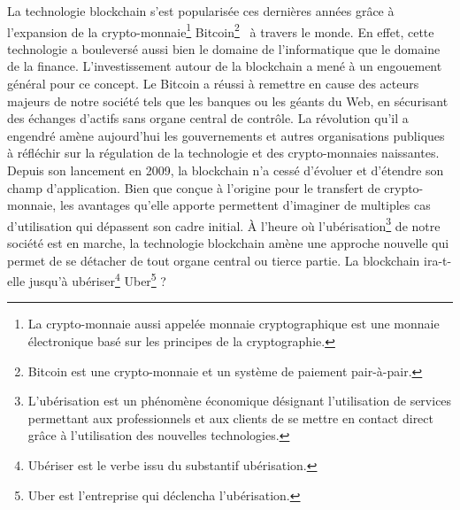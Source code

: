 \documentclass{tnreport}
\begin{document}
La technologie blockchain s'est popularisée ces dernières années grâce à l'expansion de la crypto-monnaie\footnote{La crypto-monnaie aussi appelée monnaie cryptographique est une monnaie électronique basé sur les principes de la cryptographie.} Bitcoin\footnote{Bitcoin est une crypto-monnaie et un système de paiement pair-à-pair.}~\cite{Bitcoin} à travers le monde. 
En effet, cette technologie a bouleversé aussi bien le domaine de l'informatique que le domaine de la finance. 
L'investissement autour de la blockchain a mené à un engouement général pour ce concept. 
Le Bitcoin a réussi à remettre en cause des acteurs majeurs de notre société tels que les banques ou les géants du Web, en sécurisant des échanges d'actifs sans organe central de contrôle. 
La révolution qu'il a engendré amène aujourd'hui les gouvernements et autres organisations publiques à réfléchir sur la régulation de la technologie et des crypto-monnaies naissantes.
Depuis son lancement en 2009, la blockchain n'a cessé d'évoluer et d'étendre son champ d'application.
Bien que conçue à l'origine pour le transfert de crypto-monnaie, les avantages qu'elle apporte permettent d'imaginer de multiples cas d'utilisation qui dépassent son cadre initial.
À l'heure où l'ubérisation\footnote{L'ubérisation est un phénomène économique désignant l'utilisation de services permettant aux professionnels et aux clients de se mettre en contact direct grâce à l'utilisation des nouvelles technologies.} de notre société est en marche, la technologie blockchain amène une approche nouvelle qui permet de se détacher de tout organe central ou tierce partie. 
La blockchain ira-t-elle jusqu'à ubériser\footnote{Ubériser est le verbe issu du substantif ubérisation.} Uber\footnote{Uber est l'entreprise qui déclencha l'ubérisation.} ?

\end{document}

